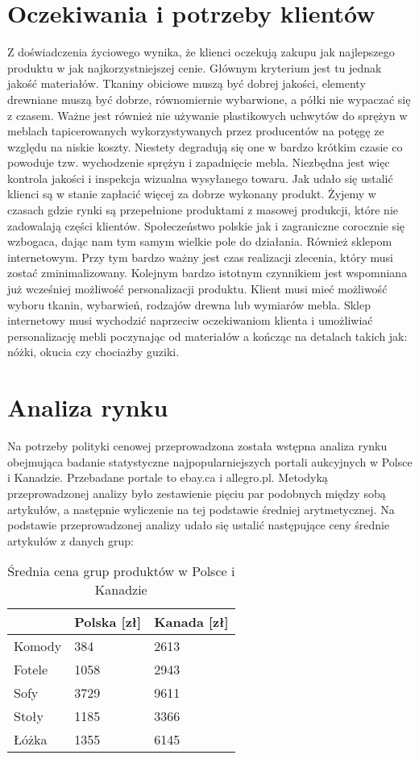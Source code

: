 		
	\section{Oczekiwania i potrzeby klientów}
		\par Z doświadczenia życiowego wynika, że klienci oczekują zakupu jak najlepszego produktu w jak najkorzystniejszej cenie. Głównym kryterium jest tu jednak jakość materiałów. Tkaniny obiciowe muszą być dobrej jakości, elementy drewniane muszą być dobrze, równomiernie wybarwione, a półki nie wypaczać się z czasem. Ważne jest również nie używanie plastikowych uchwytów do sprężyn w meblach tapicerowanych wykorzystywanych przez producentów na potęgę ze względu na niskie koszty. Niestety degradują się one w bardzo krótkim czasie co powoduje tzw. wychodzenie sprężyn i zapadnięcie mebla. Niezbędna jest więc kontrola jakości i inspekcja wizualna wysyłanego towaru. Jak udało się ustalić klienci są w stanie zapłacić więcej za dobrze wykonany produkt. Żyjemy w czasach gdzie rynki są przepełnione produktami z masowej produkcji, które nie zadowalają części klientów. Społeczeństwo polskie jak i zagraniczne corocznie się wzbogaca, dając nam tym samym wielkie pole do działania. Również sklepom internetowym. Przy tym bardzo ważny jest czas realizacji zlecenia, który musi zostać zminimalizowany. Kolejnym bardzo istotnym czynnikiem jest wspomniana już wcześniej możliwość personalizacji produktu. Klient musi mieć możliwość wyboru tkanin, wybarwień, rodzajów drewna lub wymiarów mebla. Sklep internetowy musi wychodzić naprzeciw oczekiwaniom klienta i umożliwiać personalizację mebli poczynając od materiałów a kończąc na detalach takich jak: nóżki, okucia czy chociażby guziki.
		
		
	\section{Analiza rynku}
		\par Na potrzeby polityki cenowej przeprowadzona została wstępna analiza rynku obejmująca badanie statystyczne najpopularniejszych portali aukcyjnych w Polsce i Kanadzie. Przebadane portale to ebay.ca i allegro.pl. Metodyką przeprowadzonej analizy było zestawienie pięciu par podobnych między sobą artykułów, a następnie wyliczenie na tej podstawie średniej arytmetycznej. Na podstawie przeprowadzonej analizy udało się ustalić następujące ceny średnie artykułów z danych grup:
		
		\begin{table}[H]
		\centering
		\begin{tabular}{|l|l|l|}
		\hline
					& Polska [zł] & Kanada [zł]\\ \hline
		Komody 	& 384  & 2613 \\ \hline
		Fotele 	& 1058 & 2943 \\ \hline
		Sofy   	& 3729 & 9611 \\ \hline
		Stoły  	& 1185 & 3366 \\ \hline
		Łóżka  	& 1355 & 6145 \\ \hline
		\end{tabular}
		\caption{Średnia cena grup produktów w Polsce i Kanadzie}
		\label{avg_grp_price_ca_pl}
		\end{table}

